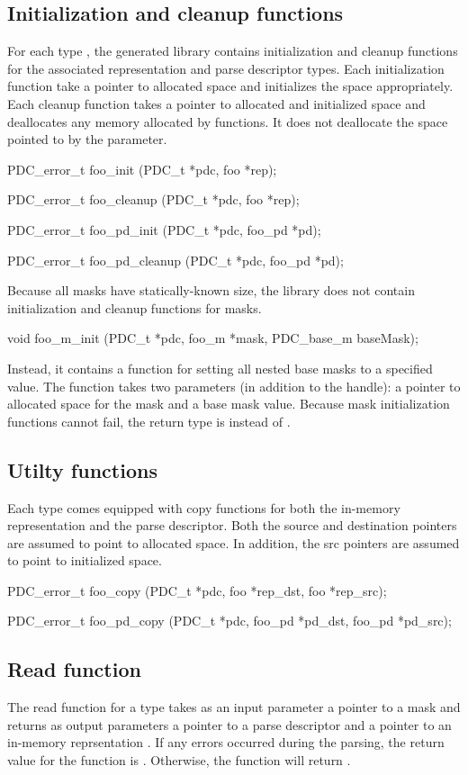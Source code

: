\subsection{Initialization and cleanup functions}
For each type , the generated library contains
initialization and cleanup functions for the associated representation
 and parse descriptor  types.  Each initialization
function take a pointer to allocated space and initializes the space
appropriately.  Each cleanup function takes a pointer to allocated and
initialized space and deallocates any memory allocated by \pads{} functions.
It does not deallocate the space pointed to by the parameter.  
\begin{code}
PDC_error_t foo_init (PDC_t *pdc, foo *rep);

PDC_error_t foo_cleanup (PDC_t *pdc, foo *rep);

PDC_error_t foo_pd_init (PDC_t *pdc, foo_pd *pd);

PDC_error_t foo_pd_cleanup (PDC_t *pdc, foo_pd *pd);
\end{code}
Because all masks have statically-known size, the library does not
contain initialization and cleanup functions for masks.  
\begin{code}
void foo_m_init (PDC_t *pdc, foo_m *mask, PDC_base_m baseMask);
\end{code}
Instead, it
contains a function for setting all nested base masks 
to a specified value.  The function takes two parameters (in
addition to the \pads{} handle): a pointer to allocated space for the
mask and a base mask value.  Because mask initialization
functions cannot fail, the return type is  instead of
. 

\subsection{Utilty functions}
Each type  comes equipped with copy functions for both the
in-memory representation and the parse descriptor.  Both the source
and destination pointers are assumed to point to allocated space.  In
addition, the src pointers are assumed to point to initialized space.
\begin{code}
PDC_error_t foo_copy (PDC_t *pdc, foo *rep_dst, foo *rep_src);

PDC_error_t foo_pd_copy (PDC_t *pdc, foo_pd *pd_dst, foo_pd *pd_src);
\end{code}

\subsection{Read function}
The read function for a \pads{} type  takes as an input parameter a
pointer to a mask  and returns as output parameters a pointer to
a parse descriptor  and a pointer to an in-memory
reprsentation .  If any errors occurred during the parsing, the return
value for the function is .  Otherwise, the function
will return .  

